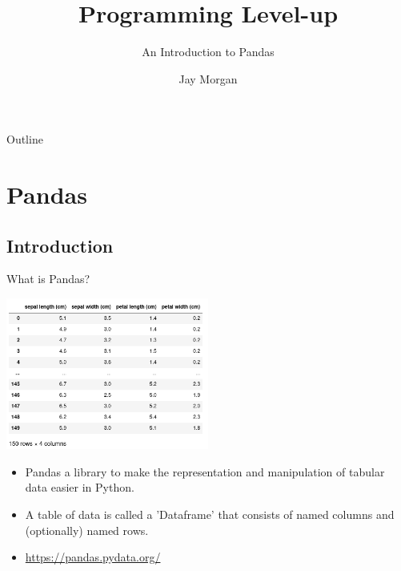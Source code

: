 \documentclass[10pt]{beamer}
\author{Jay Morgan}
\date{}
\title{Programming Level-up}
\subtitle{An Introduction to Pandas}
\begin{document}
\maketitle
\begin{frame}{Outline}
\tableofcontents
\end{frame}


\section{Pandas}
\label{sec:org89153d3}

\subsection{Introduction}
\label{sec:orgd4fef91}

\begin{frame}[label={sec:org4513bde}]{What is Pandas?}
\begin{center}
\includegraphics[width=0.5\textwidth]{./images/pandas.jpg}
\end{center}

\begin{itemize}
\item Pandas a library to make the representation and manipulation of tabular data
easier in Python.
\item A table of data is called a 'Dataframe' that consists of named columns and
(optionally) named rows.
\item \url{https://pandas.pydata.org/}
\end{itemize}
\end{frame}
\end{document}
